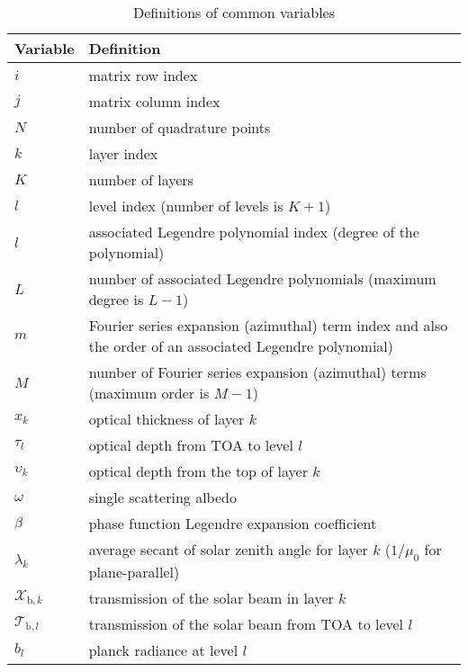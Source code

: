 \documentclass[letterpaper, 11pt]{article}
\begin{document}
\begin{table}
	\center
	\caption{Definitions of common variables}
	\vspace{0.2cm}
	\begin{tabular}{lp{.85\linewidth}}
		\toprule
		Variable & Definition \\
		\midrule
		$i$				& matrix row index \\
		$j$				& matrix column index \\
		$N$				& number of quadrature points \\
		$k$				& layer index \\
		$K$				& number of layers \\
		$l$				& level index (number of levels is $K + 1$) \\
		$l$				& associated Legendre polynomial index (degree of the polynomial) \\
		$L$				& number of associated Legendre polynomials (maximum degree is $L - 1$) \\
		$m$				& Fourier series expansion (azimuthal) term index and also the order of an associated Legendre polynomial) \\
		$M$				& number of Fourier series expansion (azimuthal) terms (maximum order is $M - 1$) \\
		$x_{k}$				& optical thickness of layer $k$ \\
		$\tau_{l}$			& optical depth from TOA to level $l$ \\
		$\upsilon_{k}$			& optical depth from the top of layer $k$ \\
		$\omega$			& single scattering albedo \\
		$\beta$				& phase function Legendre expansion coefficient \\
		$\lambda_{k}$			& average secant of solar zenith angle for layer $k$ ($1 / \mu_{0}$ for plane-parallel) \\
		$\mathcal{X}_{\mathrm{b},k}$	& transmission of the solar beam in layer $k$ \\
		$\mathcal{T}_{\mathrm{b},l}$	& transmission of the solar beam from TOA to level $l$ \\
		$b_{l}$				& planck radiance at level $l$ \\
		\bottomrule
	\end{tabular}
	\label{tab:common_variables}
\end{table}
\end{document}
